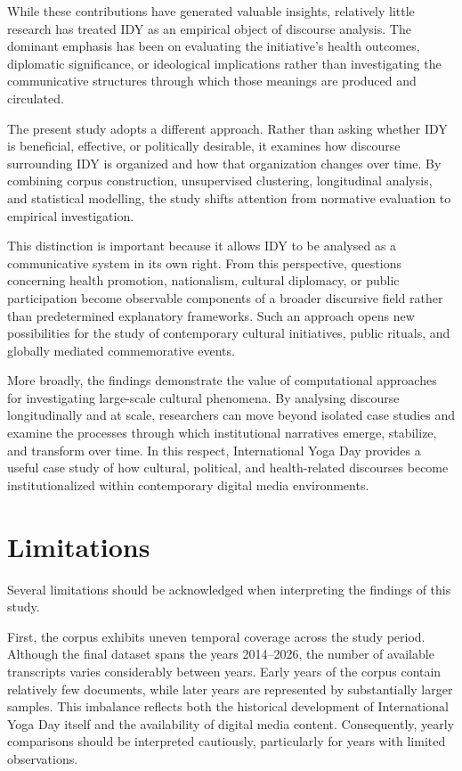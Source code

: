 \documentclass[11pt]{article}
\begin{document}
While these contributions have generated valuable insights, relatively little research has treated IDY as an empirical
object of discourse analysis. The dominant emphasis has been on evaluating the initiative's health outcomes, diplomatic
significance, or ideological implications rather than investigating the communicative structures through which those
meanings are produced and circulated.


The present study adopts a different approach. Rather than asking whether IDY is beneficial, effective, or politically
desirable, it examines how discourse surrounding IDY is organized and how that organization changes over time. By
combining corpus construction, unsupervised clustering, longitudinal analysis, and statistical modelling, the study
shifts attention from normative evaluation to empirical investigation.


This distinction is important because it allows IDY to be analysed as a communicative system in its own right. From this
perspective, questions concerning health promotion, nationalism, cultural diplomacy, or public participation become
observable components of a broader discursive field rather than predetermined explanatory frameworks. Such an approach
opens new possibilities for the study of contemporary cultural initiatives, public rituals, and globally mediated
commemorative events.


More broadly, the findings demonstrate the value of computational approaches for investigating large-scale cultural
phenomena. By analysing discourse longitudinally and at scale, researchers can move beyond isolated case studies and
examine the processes through which institutional narratives emerge, stabilize, and transform over time. In this
respect, International Yoga Day provides a useful case study of how cultural, political, and health-related discourses
become institutionalized within contemporary digital media environments.


\section{Limitations}



Several limitations should be acknowledged when interpreting the findings of this study.



First, the corpus exhibits uneven temporal coverage across the study period. Although the final dataset spans the years
2014--2026, the number of available transcripts varies considerably between years. Early years of the corpus contain
relatively few documents, while later years are represented by substantially larger samples. This imbalance reflects
both the historical development of International Yoga Day itself and the availability of digital media content.
Consequently, yearly comparisons should be interpreted cautiously, particularly for years with limited observations.
\end{document}
